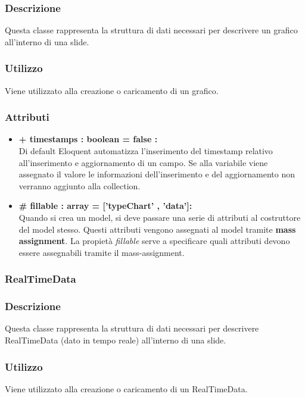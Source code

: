	\subsubsection*{Descrizione}
	Questa classe rappresenta la struttura di dati necessari per descrivere un grafico all’interno di una slide.
	
	\subsubsection*{Utilizzo}
Viene utilizzato alla creazione o caricamento di un grafico.

	\subsubsection*{Attributi}
	\begin{itemize}
		\item \textbf{+ timestamps : boolean = false :}\\
		Di default Eloquent automatizza l'inserimento del timestamp relativo all'inserimento e aggiornamento di un campo. Se alla variabile viene assegnato il valore le informazioni dell'inserimento e del aggiornamento non verranno aggiunto alla collection.
		\item \textbf{\# fillable : array = [’typeChart’ , ’data’]:}\\
		Quando si crea un model, si deve passare una serie di attributi al costruttore del model stesso. Questi attributi vengono assegnati al model tramite \textbf{mass assignment}. La propietà \textit{fillable} serve a specificare quali attributi devono essere assegnabili tramite il mass-assignment.
		
	\end{itemize}
	

\newpage
\subsubsection{RealTimeData}


	\subsubsection*{Descrizione}
	Questa classe rappresenta la struttura di dati necessari per descrivere RealTimeData (dato in tempo reale) all’interno di una slide.
	
	\subsubsection*{Utilizzo}
	Viene utilizzato alla creazione o caricamento di un RealTimeData.
	
